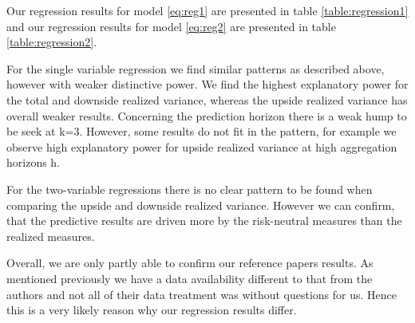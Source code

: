 \vspace{4mm}
Our regression results for model \ref{eq:reg1} are presented in table \ref{table:regression1} and our regression results for model \ref{eq:reg2} are presented in table \ref{table:regression2}.

\vspace{4mm}
For the single variable regression we find similar patterns as described above, however with weaker distinctive power. We find the highest explanatory power for the total and downside realized variance, whereas the upside realized variance has overall weaker results. Concerning the prediction horizon there is a weak hump to be seek at k=3. However, some results do not fit in the pattern, for example we observe high explanatory power for upside realized variance at high aggregation horizons h.

\vspace{4mm}
For the two-variable regressions there is no clear pattern to be found when comparing the upside and downside realized variance. However we can confirm, that the predictive results are driven more by the risk-neutral measures than the realized measures.

\vspace{4mm}
Overall, we are only partly able to confirm our reference papers results. As mentioned previously we have a data availability different to that from the authors and not all of their data treatment was without questions for us. Hence this is a very likely reason why our regression results differ. 



